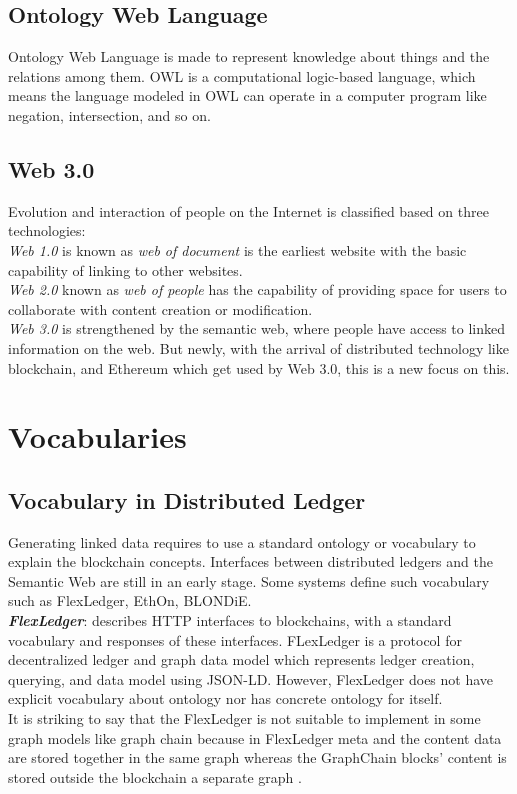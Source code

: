 \subsection{Ontology Web Language }
Ontology Web Language is made to represent knowledge about things and the relations among them. OWL is a computational logic-based language, which means the language modeled in OWL can operate in a computer program like negation, intersection, and so on\cite{Hector}.

\subsection{Web 3.0}\cite{Hector}
Evolution and interaction of people on the Internet is classified based on three technologies:\\
\textit{Web 1.0} is known as \textit{web of document} is the earliest website with the basic capability of linking to other websites.\\
\textit{Web 2.0} known as  \textit{web of people} has the capability of providing space for users to collaborate with content creation or modification.\\
\textit{Web 3.0} is strengthened by the semantic web, where people have access to linked information on the web. But newly, with the arrival of distributed technology like blockchain, and Ethereum which get used by Web 3.0, this is a new focus on this.
\section{Vocabularies}
\subsection{Vocabulary in Distributed Ledger}
Generating linked data requires to use a standard ontology or vocabulary to explain the blockchain concepts. Interfaces between distributed ledgers and the Semantic Web are still in an early stage. Some systems define such vocabulary such as FlexLedger, EthOn, BLONDiE\cite{Third}.\\

\textbf{\textit{FlexLedger}}: describes HTTP interfaces to blockchains, with a standard vocabulary and responses of these interfaces. FLexLedger is a protocol for decentralized ledger and graph data model which represents ledger creation, querying, and data model using JSON-LD. However, FlexLedger does not have explicit vocabulary about ontology nor has concrete ontology for itself. \\
It is striking to say that the FlexLedger is not suitable to implement in some graph models like graph chain because in FlexLedger meta and the content data are stored together in the same graph whereas the GraphChain blocks’ content is stored outside the blockchain a separate graph \cite{Sopek}.\\

